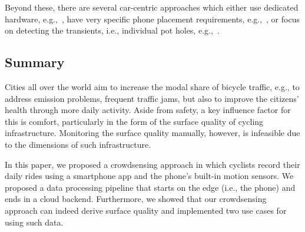 Beyond these, there are several car-centric approaches which either use dedicated hardware, e.g.,~\cite{chen2013crsm}, have very specific phone placement requirements, e.g.,~\cite{daraghmi2020crowdsourcing}, or focus on detecting the transients, i.e., individual pot holes, e.g.,~\cite{alam2020crowdsourcing,li2014crowdsourcing,lima2016using}.


\subsection{Summary}
\label{subsec:summary_cyclequality}
Cities all over the world aim to increase the modal share of bicycle traffic, e.g., to address emission problems, frequent traffic jams, but also to improve the citizens' health through more daily activity.
Aside from safety, a key influence factor for this is comfort, particularly in the form of the surface quality of cycling infrastructure.
Monitoring the surface quality manually, however, is infeasible due to the dimensions of such infrastructure.

In this paper, we proposed a crowdsensing approach in which cyclists record their daily rides using a smartphone app and the phone's built-in motion sensors.
We proposed a data processing pipeline that starts on the edge (i.e., the phone) and ends in a cloud backend.
Furthermore, we showed that our crowdsensing approach can indeed derive surface quality and implemented two use cases for using such data.



